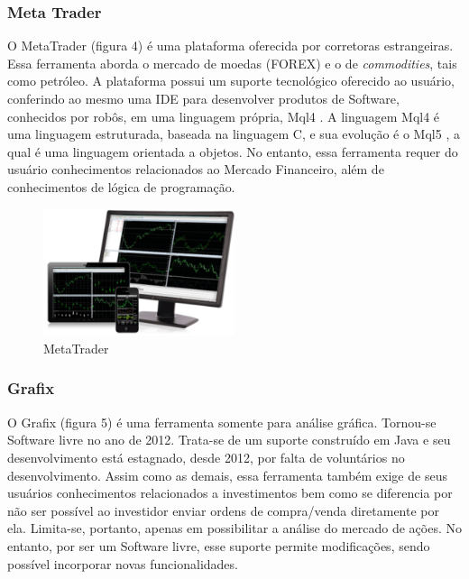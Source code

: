 \subsubsection{Meta Trader}

O MetaTrader (figura 4) é uma plataforma oferecida por corretoras estrangeiras. Essa ferramenta aborda o mercado de moedas (FOREX) e o de \textit{commodities}, tais como petróleo. A plataforma possui um suporte tecnológico oferecido ao usuário, conferindo ao mesmo uma IDE para desenvolver produtos de Software, conhecidos por robôs, em uma linguagem própria, Mql4 \cite{kovalyov2006}. A linguagem Mql4 é uma linguagem estruturada, baseada na linguagem C, e sua evolução é o Mql5 \cite{metaquotes2014}, a qual é uma linguagem orientada a objetos. No entanto, essa ferramenta requer do usuário conhecimentos relacionados ao Mercado Financeiro, além de conhecimentos de lógica de programação.

\begin{figure}[h]
\centering
\label{f04}
\includegraphics[width=0.5\textwidth]{figuras/f04}
\caption{MetaTrader}

\end{figure}


\subsubsection{Grafix}

O Grafix (figura 5) é uma ferramenta somente para análise gráfica. Tornou-se Software livre no ano de 2012. Trata-se de um suporte construído em Java e seu desenvolvimento está estagnado, desde 2012, por falta de voluntários no desenvolvimento. Assim como as demais, essa ferramenta também exige de seus usuários conhecimentos relacionados a investimentos bem como se diferencia por não ser possível ao investidor enviar ordens de compra/venda diretamente por ela. Limita-se, portanto, apenas em possibilitar a análise do mercado de ações. No entanto, por ser um Software livre, esse suporte permite modificações, sendo possível incorporar novas funcionalidades.

